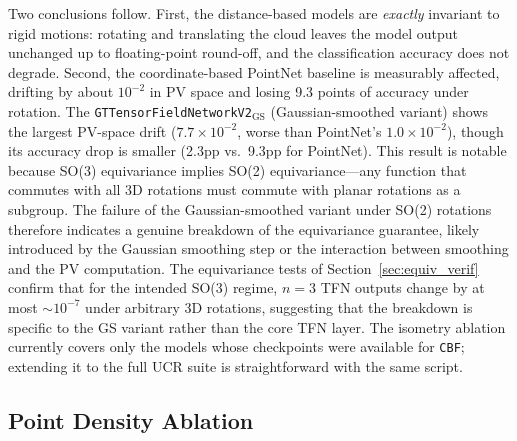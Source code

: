 \documentclass[a4paper,11pt]{article}
\begin{document}
Two conclusions follow.
First, the distance-based models are \emph{exactly} invariant to rigid motions: rotating and translating the cloud leaves the model output unchanged up to floating-point round-off, and the classification accuracy does not degrade.
Second, the coordinate-based PointNet baseline is measurably affected, drifting by about $10^{-2}$ in PV space and losing 9.3 points of accuracy under rotation.
The \texttt{GTTensorFieldNetworkV2}$_\mathrm{GS}$ (Gaussian-smoothed variant) shows the largest PV-space drift ($7.7\times10^{-2}$, worse than PointNet's $1.0\times10^{-2}$), though its accuracy drop is smaller (2.3pp vs.\ 9.3pp for PointNet).
This result is notable because SO(3) equivariance implies SO(2) equivariance---any function that commutes with all 3D rotations must commute with planar rotations as a subgroup.
The failure of the Gaussian-smoothed variant under SO(2) rotations therefore indicates a genuine breakdown of the equivariance guarantee, likely introduced by the Gaussian smoothing step or the interaction between smoothing and the PV computation.
The equivariance tests of Section~\ref{sec:equiv_verif} confirm that for the intended SO(3) regime, $n=3$ TFN outputs change by at most ${\sim}10^{-7}$ under arbitrary 3D rotations, suggesting that the breakdown is specific to the GS variant rather than the core TFN layer.
The isometry ablation currently covers only the models whose checkpoints were available for \texttt{CBF}; extending it to the full UCR suite is straightforward with the same script.

\subsection{Point Density Ablation} \label{sec:density}
\end{document}
